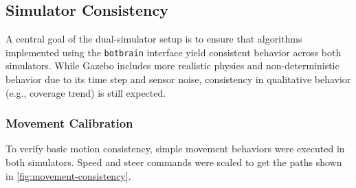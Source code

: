 \subsection{Simulator Consistency}
\label{sec:simulator-consistency}
A central goal of the dual-simulator setup is to ensure that algorithms implemented using the \texttt{botbrain} interface yield consistent behavior across both simulators. While Gazebo includes more realistic physics and non-deterministic behavior due to its time step and sensor noise, consistency in qualitative behavior (e.g., coverage trend) is still expected.

\subsubsection{Movement Calibration}
To verify basic motion consistency, simple movement behaviors were executed in both simulators. Speed and steer commands were scaled to get the paths shown in \cref{fig:movement-consistency}. 


